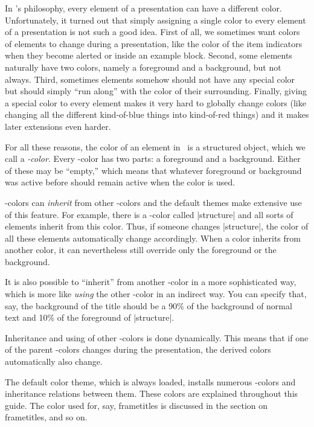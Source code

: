 In \beamer's philosophy, every element of a presentation can have a different color. Unfortunately, it turned out that simply assigning a single color to every element of a presentation is not such a good idea. First of all, we sometimes want colors of elements to change during a presentation, like the color of the item indicators when they become alerted or inside an example block. Second, some elements naturally have two colors, namely a foreground and a background, but not always. Third, sometimes elements somehow should not have any special color but should simply ``run along'' with the color of their surrounding. Finally, giving a special color to every element makes it very hard to globally change colors (like changing all the different kind-of-blue things into kind-of-red things) and it makes later extensions even harder.

For all these reasons, the color of an element in \beamer\ is a structured object, which we call a \emph{\beamer-color}. Every \beamer-color has two parts: a foreground and a background. Either of these may be ``empty,'' which means that whatever foreground or background was active before should remain active when the color is used.

\beamer-colors can \emph{inherit} from other \beamer-colors and the default themes make extensive use of this feature. For example, there is a \beamer-color called |structure| and all sorts of elements inherit from this color. Thus, if someone changes |structure|, the color of all these elements automatically change accordingly. When a color inherits from another color, it can nevertheless still override only the foreground or the background.

It is also possible to ``inherit'' from another \beamer-color in a more sophisticated way, which is more like \emph{using} the other \beamer-color in an indirect way. You can specify that, say, the background of the title should be a 90\% of the background of normal text and 10\% of the foreground of |structure|.

Inheritance and using of other \beamer-colors is done dynamically. This means that if one of the parent \beamer-colors changes during the presentation, the derived colors automatically also change.

The default color theme, which is always loaded, installs numerous \beamer-colors and inheritance relations between them. These colors are explained throughout this guide. The color used for, say, frametitles is discussed in the section on frametitles, and so on.

